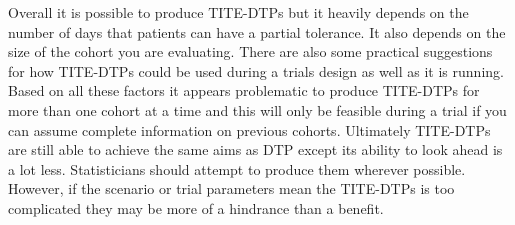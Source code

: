Overall it is possible to produce TITE-DTPs but it heavily depends on the number of days that patients can have a partial tolerance. It also depends on the size of the cohort you are evaluating. There are also some practical suggestions for how TITE-DTPs could be used during a trials design as well as it is running. Based on all these factors it appears problematic to produce TITE-DTPs for more than one cohort at a time and this will only be feasible during a trial if you can assume complete information on previous cohorts. Ultimately TITE-DTPs are still able to achieve the same aims as DTP except its ability to look ahead is a lot less. Statisticians should attempt to produce them wherever possible. However, if the scenario or trial parameters mean the TITE-DTPs is too complicated they may be more of a hindrance than a benefit.










































